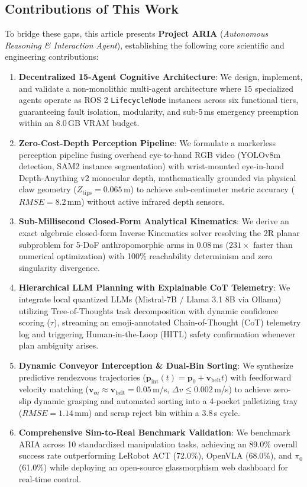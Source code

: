 \documentclass[journal]{IEEEtran}
\begin{document}
\subsection{Contributions of This Work}
To bridge these gaps, this article presents \textbf{Project ARIA} (\textit{Autonomous Reasoning \& Interaction Agent}), establishing the following core scientific and engineering contributions:
\begin{enumerate}
    \item \textbf{Decentralized 15-Agent Cognitive Architecture}: We design, implement, and validate a non-monolithic multi-agent architecture where 15 specialized agents operate as ROS 2 \texttt{LifecycleNode} instances across six functional tiers, guaranteeing fault isolation, modularity, and sub-5\,ms emergency preemption within an 8.0\,GB VRAM budget.
    \item \textbf{Zero-Cost-Depth Perception Pipeline}: We formulate a markerless perception pipeline fusing overhead eye-to-hand RGB video (YOLOv8m detection, SAM2 instance segmentation) with wrist-mounted eye-in-hand Depth-Anything v2 monocular depth, mathematically grounded via physical claw geometry ($Z_{\text{tips}} = 0.065$\,m) to achieve sub-centimeter metric accuracy ($RMSE = 8.2$\,mm) without active infrared depth sensors.
    \item \textbf{Sub-Millisecond Closed-Form Analytical Kinematics}: We derive an exact algebraic closed-form Inverse Kinematics solver resolving the 2R planar subproblem for 5-DoF anthropomorphic arms in $0.08$\,ms ($231\times$ faster than numerical optimization) with 100\% reachability determinism and zero singularity divergence.
    \item \textbf{Hierarchical LLM Planning with Explainable CoT Telemetry}: We integrate local quantized LLMs (Mistral-7B / Llama 3.1 8B via Ollama) utilizing Tree-of-Thoughts task decomposition with dynamic confidence scoring ($\tau$), streaming an emoji-annotated Chain-of-Thought (CoT) telemetry log and triggering Human-in-the-Loop (HITL) safety confirmation whenever plan ambiguity arises.
    \item \textbf{Dynamic Conveyor Interception \& Dual-Bin Sorting}: We synthesize predictive rendezvous trajectories ($\mathbf{p}_{\text{int}}(t) = \mathbf{p}_0 + \mathbf{v}_{\text{belt}}t$) with feedforward velocity matching ($\mathbf{v}_{\text{ee}} \approx \mathbf{v}_{\text{belt}} = 0.05$\,m/s, $\Delta v \le 0.002$\,m/s) to achieve zero-slip dynamic grasping and automated sorting into a 4-pocket palletizing tray ($RMSE = 1.14$\,mm) and scrap reject bin within a $3.8$\,s cycle.
    \item \textbf{Comprehensive Sim-to-Real Benchmark Validation}: We benchmark ARIA across 10 standardized manipulation tasks, achieving an 89.0\% overall success rate outperforming LeRobot ACT (72.0\%), OpenVLA (68.0\%), and $\pi_0$ (61.0\%) while deploying an open-source glassmorphism web dashboard for real-time control.
\end{enumerate}
\end{document}
